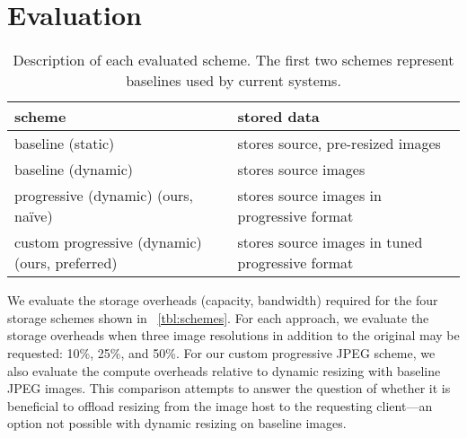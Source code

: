 \section{Evaluation}
\begin{table}
\begin{footnotesize}
\begin{tabular}{|p{3.5cm}|p{3.5cm}|}
\hline
\textbf{scheme}&\textbf{stored data}\\
\hline
baseline (static)&stores source, pre-resized images\\
\hline
baseline (dynamic)&stores source images\\
\hline
progressive (dynamic) (ours, na\"ive)&stores source images in progressive format\\
\hline
custom progressive (dynamic) (ours, preferred)&stores source images in tuned progressive format\\
\hline
\end{tabular}
\end{footnotesize}
\caption{
Description of each evaluated scheme.
The first two schemes represent baselines used by current systems. 
}
\label{tbl:schemes}
\end{table}
We evaluate the storage overheads (capacity, bandwidth) required for the four storage schemes shown in ~\autoref{tbl:schemes}.
For each approach, we evaluate the storage overheads when three image resolutions in addition to the original may be requested: 10\%, 25\%, and 50\%.
For our custom progressive JPEG scheme, we also evaluate the compute overheads relative to dynamic resizing with baseline JPEG images.
This comparison attempts to answer the question of whether it is beneficial to
offload resizing from the image host to the requesting client---an option not possible with dynamic resizing on baseline images.



